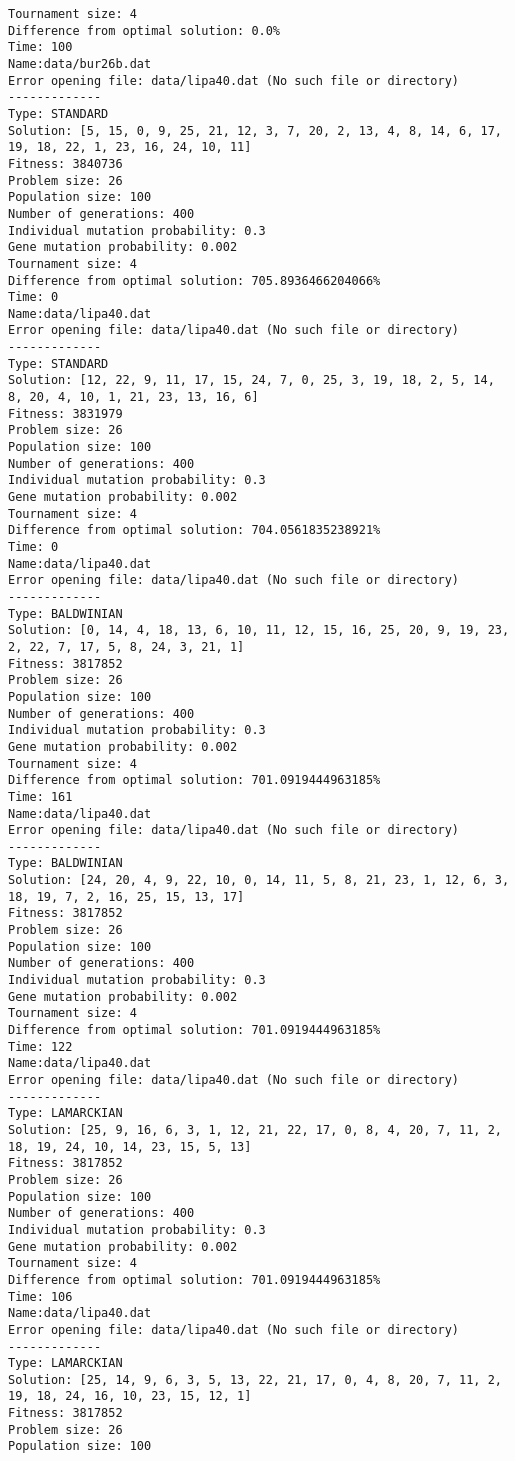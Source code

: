 \begin{lstlisting}
Tournament size: 4
Difference from optimal solution: 0.0%
Time: 100
Name:data/bur26b.dat
Error opening file: data/lipa40.dat (No such file or directory)
-------------
Type: STANDARD
Solution: [5, 15, 0, 9, 25, 21, 12, 3, 7, 20, 2, 13, 4, 8, 14, 6, 17, 19, 18, 22, 1, 23, 16, 24, 10, 11]
Fitness: 3840736
Problem size: 26
Population size: 100
Number of generations: 400
Individual mutation probability: 0.3
Gene mutation probability: 0.002
Tournament size: 4
Difference from optimal solution: 705.8936466204066%
Time: 0
Name:data/lipa40.dat
Error opening file: data/lipa40.dat (No such file or directory)
-------------
Type: STANDARD
Solution: [12, 22, 9, 11, 17, 15, 24, 7, 0, 25, 3, 19, 18, 2, 5, 14, 8, 20, 4, 10, 1, 21, 23, 13, 16, 6]
Fitness: 3831979
Problem size: 26
Population size: 100
Number of generations: 400
Individual mutation probability: 0.3
Gene mutation probability: 0.002
Tournament size: 4
Difference from optimal solution: 704.0561835238921%
Time: 0
Name:data/lipa40.dat
Error opening file: data/lipa40.dat (No such file or directory)
-------------
Type: BALDWINIAN
Solution: [0, 14, 4, 18, 13, 6, 10, 11, 12, 15, 16, 25, 20, 9, 19, 23, 2, 22, 7, 17, 5, 8, 24, 3, 21, 1]
Fitness: 3817852
Problem size: 26
Population size: 100
Number of generations: 400
Individual mutation probability: 0.3
Gene mutation probability: 0.002
Tournament size: 4
Difference from optimal solution: 701.0919444963185%
Time: 161
Name:data/lipa40.dat
Error opening file: data/lipa40.dat (No such file or directory)
-------------
Type: BALDWINIAN
Solution: [24, 20, 4, 9, 22, 10, 0, 14, 11, 5, 8, 21, 23, 1, 12, 6, 3, 18, 19, 7, 2, 16, 25, 15, 13, 17]
Fitness: 3817852
Problem size: 26
Population size: 100
Number of generations: 400
Individual mutation probability: 0.3
Gene mutation probability: 0.002
Tournament size: 4
Difference from optimal solution: 701.0919444963185%
Time: 122
Name:data/lipa40.dat
Error opening file: data/lipa40.dat (No such file or directory)
-------------
Type: LAMARCKIAN
Solution: [25, 9, 16, 6, 3, 1, 12, 21, 22, 17, 0, 8, 4, 20, 7, 11, 2, 18, 19, 24, 10, 14, 23, 15, 5, 13]
Fitness: 3817852
Problem size: 26
Population size: 100
Number of generations: 400
Individual mutation probability: 0.3
Gene mutation probability: 0.002
Tournament size: 4
Difference from optimal solution: 701.0919444963185%
Time: 106
Name:data/lipa40.dat
Error opening file: data/lipa40.dat (No such file or directory)
-------------
Type: LAMARCKIAN
Solution: [25, 14, 9, 6, 3, 5, 13, 22, 21, 17, 0, 4, 8, 20, 7, 11, 2, 19, 18, 24, 16, 10, 23, 15, 12, 1]
Fitness: 3817852
Problem size: 26
Population size: 100

\end{lstlisting}
